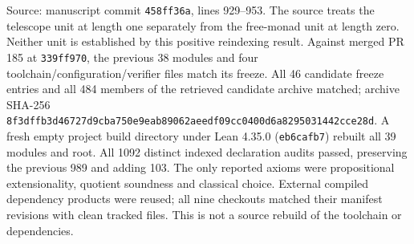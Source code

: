 \documentclass{article}
\begin{document}
\par Source: manuscript commit \texttt{458ff36a}, lines 929--953. The source treats the telescope unit at length one separately from the free-monad unit at length zero. Neither unit is established by this positive reindexing result. Against merged PR 185 at \texttt{339ff970}, the previous 38 modules and four toolchain/configuration/verifier files match its freeze. All 46 candidate freeze entries and all 484 members of the retrieved candidate archive matched; archive SHA-256 \texttt{8f3dffb3d46727d9cba750e9eab89062aeedf09cc0400d6a8295031442cce28d}. A fresh empty project build directory under Lean 4.35.0 (\texttt{eb6cafb7}) rebuilt all 39 modules and root. All 1092 distinct indexed declaration audits passed, preserving the previous 989 and adding 103. The only reported axioms were propositional extensionality, quotient soundness and classical choice. External compiled dependency products were reused; all nine checkouts matched their manifest revisions with clean tracked files. This is not a source rebuild of the toolchain or dependencies.
\end{document}
